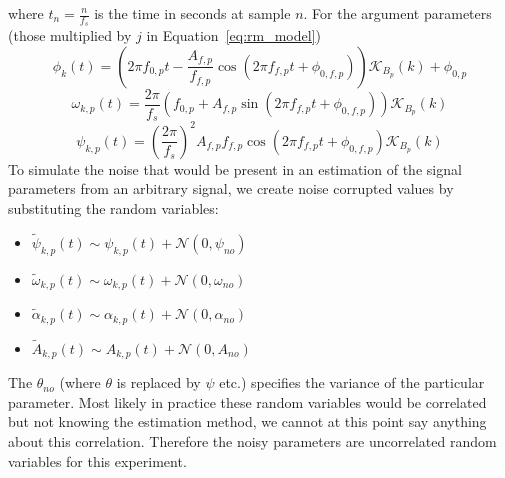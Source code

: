 where $t_{n}=\frac{n}{f_{s}}$ is the time in seconds at sample $n$. For the
argument parameters (those multiplied by $j$ in Equation~\eqref{eq:rm_model})
\[
    \phi_{k} \left( t \right)  =  \left( 2\pi f_{0,p}t - \frac{A_{f,p}}{f_{f,p}}
    \cos \left( 2\pi f_{f,p} t + \phi_{0,f,p} \right)  \right)  \mathcal{K}_{B_{p}} \left(
    k \right)  + \phi_{0,p}
\]
\[
    \omega_{k,p} \left( t \right)  = \frac{2 \pi}{f_{s}}  \left(  f_{0,p} +
    A_{f,p} \sin \left( 2 \pi f_{f,p} t + \phi_{0,f,p} \right)  \right)
    \mathcal{K}_{B_{p}} \left( k \right) 
\]
\[
    \psi_{k,p} \left( t \right)  =  \left( \frac{2 \pi}{f_{s}} \right) ^{2}
    A_{f,p} f_{f,p}  \cos \left( 2 \pi f_{f,p} t +
    \phi_{0,f,p} \right) \mathcal{K}_{B_{p}} \left( k \right) 
\]
To simulate the noise that would be present in an estimation of the signal
parameters from an arbitrary signal, we create noise corrupted values by
substituting the random variables:
\begin{itemize}
    \item
        $\tilde{\psi}_{k,p}(t) \sim
        \psi_{k,p}(t) + \mathcal{N}(0,\psi_{no})$
    \item
        $\tilde{\omega}_{k,p}(t) \sim
        \omega_{k,p}(t) + \mathcal{N}(0,\omega_{no})$
    \item
        $\tilde{\alpha}_{k,p}(t) \sim
        \alpha_{k,p}(t) + \mathcal{N}(0,\alpha_{no})$
    \item
        $\tilde{A}_{k,p}(t) \sim
        A_{k,p}(t) + \mathcal{N}(0,A_{no})$
\end{itemize}

The $\theta_{no}$ (where $\theta$ is replaced by $\psi$ etc.) specifies the
variance of the particular parameter. Most likely in practice these random
variables would be correlated but not knowing the estimation method, we cannot
at this point say anything about this correlation. Therefore the noisy
parameters are uncorrelated random variables for this experiment.

